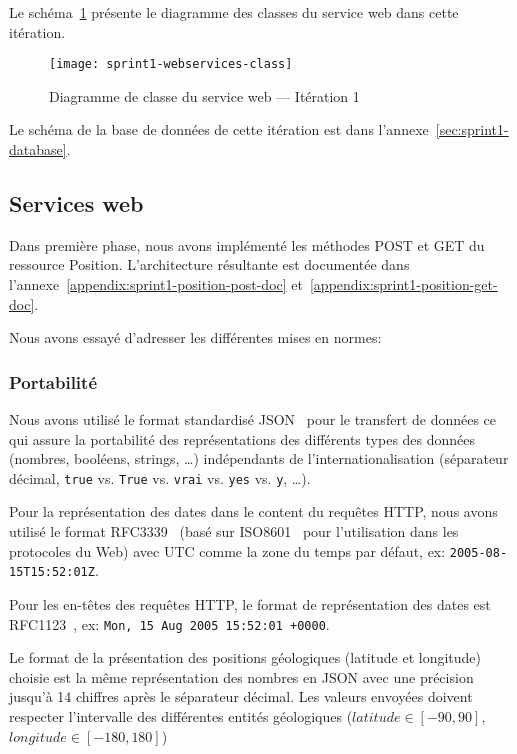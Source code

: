 Le schéma~\ref{fig:sprint1-webservices-class} présente le diagramme des classes
du service web dans cette itération.

\begin{figure}[H]
    \centering
    \texttt{[image: sprint1-webservices-class]}
    \caption{Diagramme de classe du service web --- Itération 1}
\label{fig:sprint1-webservices-class}
\end{figure}

Le schéma de la base de données de cette itération est dans
l'annexe~\ref{sec:sprint1-database}.

\subsection{Services web}

Dans première phase, nous avons implémenté les méthodes POST et GET du
ressource Position. L'architecture résultante est documentée dans
l'annexe~\ref{appendix:sprint1-position-post-doc}
et~\ref{appendix:sprint1-position-get-doc}.

Nous avons essayé d'adresser les différentes mises en normes:

\subsubsection{Portabilité}

Nous avons utilisé le format standardisé JSON~\cite{ECMA-404} pour le
transfert de données ce qui assure la portabilité des représentations des
différents types des données (nombres, booléens, strings, \ldots) indépendants
de l'internationalisation (séparateur décimal, \verb|true| vs. \verb|True| vs.
\verb|vrai| vs. \verb|yes| vs. \verb|y|, \ldots).

Pour la représentation des dates dans le content du requêtes HTTP, nous avons
utilisé le format RFC3339~\cite{RFC3339} (basé sur ISO8601~\cite{ISO8601} pour
l'utilisation dans les protocoles du Web) avec UTC comme la zone du temps par
défaut, ex: \verb|2005-08-15T15:52:01Z|.

Pour les en-têtes des requêtes HTTP, le format de représentation des dates est
RFC1123~\cite{RFC1123}, ex: \verb|Mon, 15 Aug 2005 15:52:01 +0000|.

Le format de la présentation des positions géologiques (latitude et longitude)
choisie est la même représentation des nombres en JSON avec une précision
jusqu'à 14 chiffres après le séparateur décimal. Les valeurs envoyées doivent
respecter l'intervalle des différentes entités géologiques ($latitude \in [-90,
90]$, $longitude \in [-180, 180]$)

